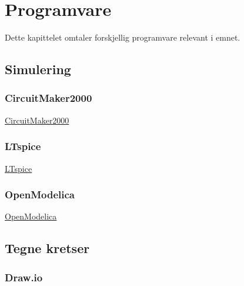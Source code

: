 \chapter{Programvare}
\label{ch:programvare}
Dette kapittelet omtaler forskjellig programvare relevant i emnet.


\section{Simulering}
\subsection{CircuitMaker2000}
\href{https://winworldpc.com/product/circuitmaker/2000}{CircuitMaker2000}
\subsection{LTspice}
\href{https://www.analog.com/en/resources/design-tools-and-calculators/ltspice-simulator.html}{LTspice}
\subsection{OpenModelica}
\href{https://openmodelica.org/}{OpenModelica}

\section{Tegne kretser}
\subsection{Draw.io}
